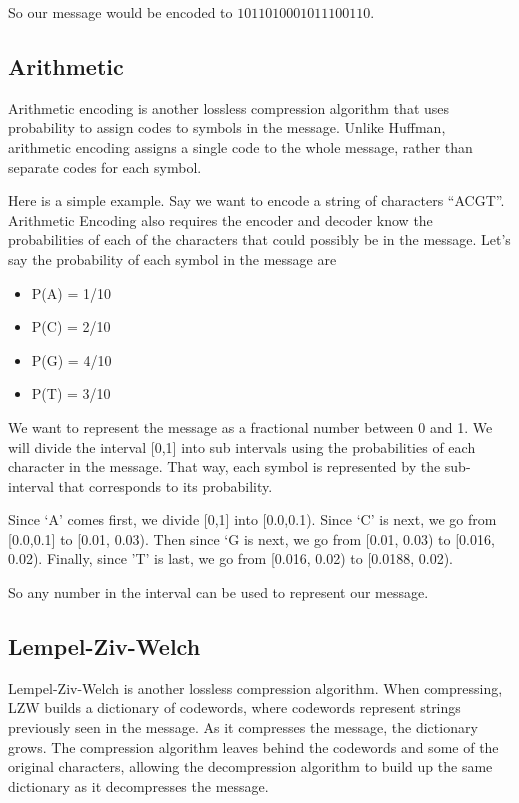 \documentclass[12pt,twoside]{reedthesis}
\providecommand{\tightlist}{%
  \setlength{\itemsep}{0pt}\setlength{\parskip}{0pt}}
\begin{document}
So our message would be encoded to \(1011010001011100110\).

\hypertarget{arithmetic}{%
\subsection{Arithmetic}\label{arithmetic}}

Arithmetic encoding is another lossless compression algorithm that uses probability to assign codes to symbols in the message. Unlike Huffman, arithmetic encoding assigns a single code to the whole message, rather than separate codes for each symbol.

Here is a simple example. Say we want to encode a string of characters ``ACGT''. Arithmetic Encoding also requires the encoder and decoder know the probabilities of each of the characters that could possibly be in the message. Let's say the probability of each symbol in the message are
\begin{itemize}
\tightlist
\item
  P(A) = 1/10
\item
  P(C) = 2/10
\item
  P(G) = 4/10
\item
  P(T) = 3/10
\end{itemize}
We want to represent the message as a fractional number between 0 and 1. We will divide the interval {[}0,1{]} into sub intervals using the probabilities of each character in the message. That way, each symbol is represented by the sub-interval that corresponds to its probability.

Since `A' comes first, we divide {[}0,1{]} into {[}0.0,0.1). Since `C' is next, we go from {[}0.0,0.1{]} to {[}0.01, 0.03). Then since `G is next, we go from {[}0.01, 0.03) to {[}0.016, 0.02). Finally, since 'T' is last, we go from {[}0.016, 0.02) to {[}0.0188, 0.02).

So any number in the interval can be used to represent our message.

\hypertarget{lempel-ziv-welch}{%
\subsection{Lempel-Ziv-Welch}\label{lempel-ziv-welch}}

Lempel-Ziv-Welch is another lossless compression algorithm. When compressing, LZW builds a dictionary of codewords, where codewords represent strings previously seen in the message. As it compresses the message, the dictionary grows. The compression algorithm leaves behind the codewords and some of the original characters, allowing the decompression algorithm to build up the same dictionary as it decompresses the message.
\end{document}
